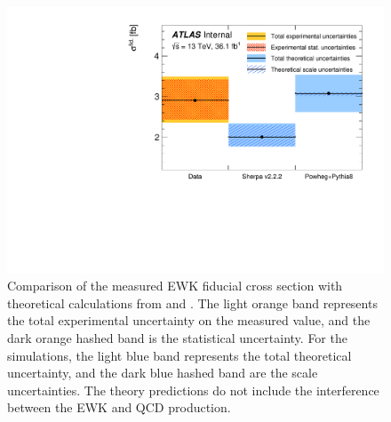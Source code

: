 \begin{figure}[htbp]
  \centering
  \includegraphics[width=.6\textwidth]{figs/ssww_13tev/results/NP_post_fit__xsec_ExpObs}
  \caption{Comparison of the measured \ssww EWK fiducial cross section with theoretical calculations from  and .  The light orange band represents the total experimental uncertainty on the measured value, and the dark orange hashed band is the statistical uncertainty.  For the simulations, the light blue band represents the total theoretical uncertainty, and the dark blue hashed band are the scale uncertainties.  The theory predictions do not include the interference between the EWK and QCD production.}
  \label{fig:ssww13tev_results_xsec}
\end{figure}
